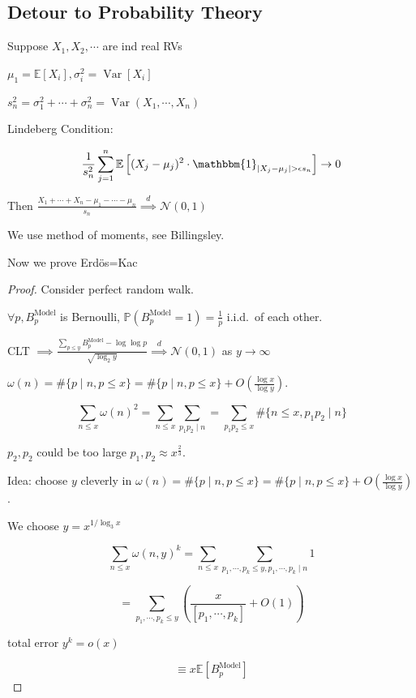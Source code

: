 \documentclass{article}
\theoremstyle{definition}
\begin{document}
    \subsection*{Detour to Probability Theory}

    Suppose \(X_1, X_2, \cdots\) are ind real RVs

    \(\mu_1 = \mathbb{E}[X_i], \sigma_i^2 = \operatorname{Var}[X_i]\) 

    \(s_n^2 = \sigma_1^2 + \cdots + \sigma_n^2 = \operatorname{Var}(X_1, \cdots , X_n)\) 

    Lindeberg Condition: 

    \[
        \frac{1}{s_n^2} \sum_{j=1}^n \mathbb{E} \left[ (X_j - \mu_j)^2 \cdot \mathbbm{1}_{\vert X_j - \mu_j \vert > \epsilon s_n}\right] \to 0 
    \]

    Then \(\frac{X_1 + \cdots + X_n - \mu_1 - \cdots - \mu_n}{s_n} \overset{d}{\implies} \mathcal{N}(0,1)\) 

    We use method of moments, see Billingsley.

    Now we prove Erd\"os=Kac

    \begin{proof}
        Consider perfect random walk.

        \(\forall p, B_p^{\text{Model}}\) is Bernoulli, \(\mathbb{P}(B_p^{\text{Model}} = 1) = \frac{1}{p}\)  i.i.d.\  of each other.

        CLT \(\implies \frac{\sum_{p \leq y} B_p^{\text{Model}} - \log \log p}{\sqrt{\log_2 y} } \overset{d}{\implies} \mathcal{N}(0,1)\) as \(y \to \infty\)
        
        \(\omega(n) = \# \{ p\mid n, p \leq x \} = \# \{ p \mid n, p \leq x \} + O \left( \frac{\log x}{\log y} \right)\). 

        \[
            \sum_{n \leq x} \omega(n)^2 = \sum_{n \leq x} \sum_{p_1 p_2 \mid n} = \sum_{p_1 p_2 \leq x} \# \{ n \leq x, p_1 p_2 \mid n \} 
        \]

        \(p_2, p_2\) could be too large \(p_1, p_2 \approx x^{\frac{2}{3}}\).

        Idea: choose \(y\) cleverly in \(\omega(n) = \# \{ p\mid n, p \leq x \} = \# \{ p \mid n, p \leq x \} + O \left( \frac{\log x}{\log y} \right)\).

        We choose \(y = x^{1 / \log_3 x}\) 

        \[
            \sum_{n \leq x} \omega(n,y)^k = \sum_{n \leq x} \sum_{p_1, \cdots, p_k \leq y, p_1, \cdots , p_k \mid n} 1
        \]

        \[
            = \sum_{p_1, \cdots , p_k \leq y} \left( \frac{x}{[p_1, \cdots , p_k]} + O(1) \right)  
        \]

        total error \(y^k = o(x)\) 

        \[\equiv x \mathbb{E} [B_p^{\text{Model}}]\] 

    \end{proof}
\end{document}
